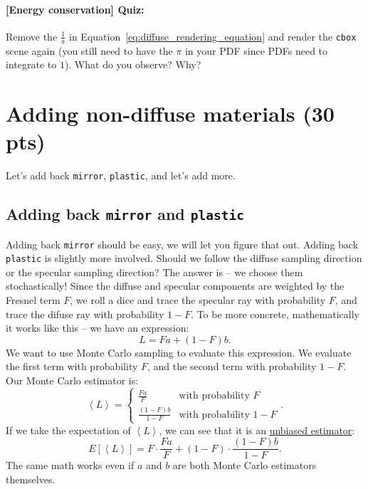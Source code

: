 \paragraph{[Energy conservation] Quiz:} Remove the $\frac{1}{\pi}$ in Equation~\eqref{eq:diffuse_rendering_equation} and render the \lstinline{cbox} scene again (you still need to have the $\pi$ in your PDF since PDFs need to integrate to $1$). What do you observe? Why?

\section{Adding non-diffuse materials (30 pts)}
Let's add back \lstinline{mirror}, \lstinline{plastic}, and let's add more. 

\subsection{Adding back \protect\lstinline!mirror! and \protect\lstinline!plastic!}
Adding back \lstinline{mirror} should be easy, we will let you figure that out. Adding back \lstinline{plastic} is slightly more involved. Should we follow the diffuse sampling direction or the specular sampling direction? The answer is -- we choose them stochastically! Since the diffuse and specular components are weighted by the Fresnel term $F$, we roll a dice and trace the specular ray with probability $F$, and trace the difuse ray with probability $1-F$. To be more concrete, mathematically it works like this -- we have an expression:
\begin{equation}
L = F a + (1 - F) b.
\end{equation}
We want to use Monte Carlo sampling to evaluate this expression. We evaluate the first term with probability $F$, and the second term with probability $1-F$. Our Monte Carlo estimator is:
\begin{equation}
\left<L\right> = \begin{cases}
\frac{F a}{F} & \text{with probability } F \\
\frac{\left(1 - F\right) b}{1 - F} & \text{with probability } 1 - F
\end{cases}.
\label{eq:discrete_mc}
\end{equation}
If we take the expectation of $\left<L\right>$, we can see that it is an \href{https://en.wikipedia.org/wiki/Bias_of_an_estimator}{unbiased estimator}:
\begin{equation}
E\left[\left<L\right>\right] = F \cdot \frac{F a}{F} + (1 - F) \cdot \frac{(1 - F) b}{1 - F}.
\end{equation}
The same math works even if $a$ and $b$ are both Monte Carlo estimators themselves.


